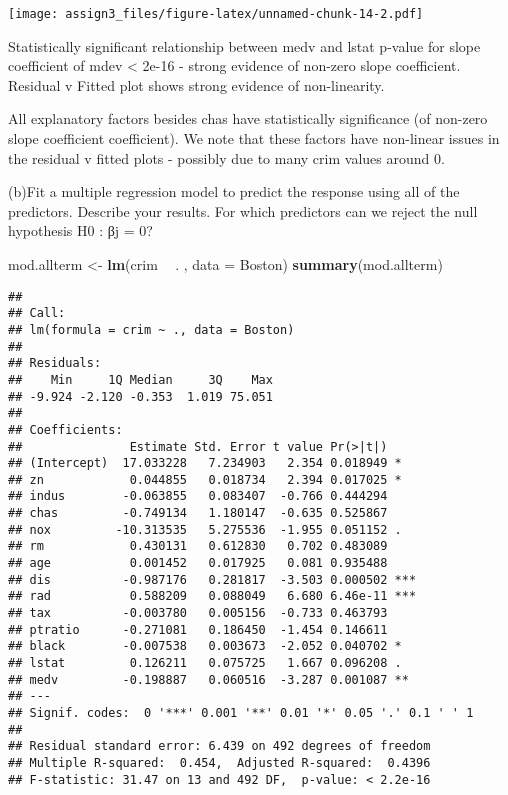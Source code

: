 \documentclass[]{article}
\newenvironment{Shaded}{\begin{snugshade}}{\end{snugshade}}
\newcommand{\DataTypeTok}[1]{\textcolor[rgb]{0.13,0.29,0.53}{#1}}
\newcommand{\KeywordTok}[1]{\textcolor[rgb]{0.13,0.29,0.53}{\textbf{#1}}}
\newcommand{\NormalTok}[1]{#1}
\newcommand{\OperatorTok}[1]{\textcolor[rgb]{0.81,0.36,0.00}{\textbf{#1}}}
\newcommand{\StringTok}[1]{\textcolor[rgb]{0.31,0.60,0.02}{#1}}
\begin{document}
\texttt{[image: assign3\_files/figure-latex/unnamed-chunk-14-2.pdf]}

Statistically significant relationship between medv and lstat p-value
for slope coefficient of mdev \textless{} 2e-16 - strong evidence of
non-zero slope coefficient. Residual v Fitted plot shows strong evidence
of non-linearity.

All explanatory factors besides chas have statistically significance (of
non-zero slope coefficient coefficient). We note that these factors have
non-linear issues in the residual v fitted plots - possibly due to many
crim values around 0.

(b)Fit a multiple regression model to predict the response using all of
the predictors. Describe your results. For which predictors can we
reject the null hypothesis H0 : βj = 0?

\begin{Shaded}
\begin{Highlighting}[]
\NormalTok{mod.allterm <-}\StringTok{ }\KeywordTok{lm}\NormalTok{(crim }\OperatorTok{~}\StringTok{ }\NormalTok{. , }\DataTypeTok{data =}\NormalTok{ Boston)}
\KeywordTok{summary}\NormalTok{(mod.allterm)}
\end{Highlighting}
\end{Shaded}

\begin{verbatim}
## 
## Call:
## lm(formula = crim ~ ., data = Boston)
## 
## Residuals:
##    Min     1Q Median     3Q    Max 
## -9.924 -2.120 -0.353  1.019 75.051 
## 
## Coefficients:
##               Estimate Std. Error t value Pr(>|t|)    
## (Intercept)  17.033228   7.234903   2.354 0.018949 *  
## zn            0.044855   0.018734   2.394 0.017025 *  
## indus        -0.063855   0.083407  -0.766 0.444294    
## chas         -0.749134   1.180147  -0.635 0.525867    
## nox         -10.313535   5.275536  -1.955 0.051152 .  
## rm            0.430131   0.612830   0.702 0.483089    
## age           0.001452   0.017925   0.081 0.935488    
## dis          -0.987176   0.281817  -3.503 0.000502 ***
## rad           0.588209   0.088049   6.680 6.46e-11 ***
## tax          -0.003780   0.005156  -0.733 0.463793    
## ptratio      -0.271081   0.186450  -1.454 0.146611    
## black        -0.007538   0.003673  -2.052 0.040702 *  
## lstat         0.126211   0.075725   1.667 0.096208 .  
## medv         -0.198887   0.060516  -3.287 0.001087 ** 
## ---
## Signif. codes:  0 '***' 0.001 '**' 0.01 '*' 0.05 '.' 0.1 ' ' 1
## 
## Residual standard error: 6.439 on 492 degrees of freedom
## Multiple R-squared:  0.454,  Adjusted R-squared:  0.4396 
## F-statistic: 31.47 on 13 and 492 DF,  p-value: < 2.2e-16
\end{verbatim}
\end{document}
